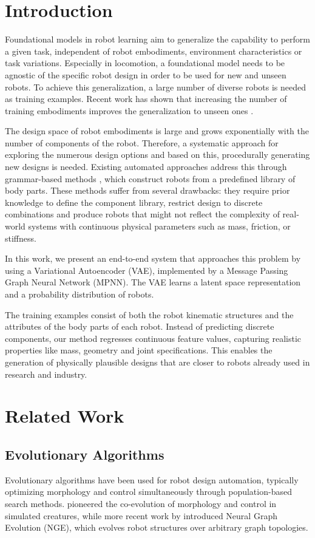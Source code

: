 \documentclass{article}
\theoremstyle{plain}
\theoremstyle{definition}
\theoremstyle{remark}
\begin{document}
\section{Introduction}
Foundational models in robot learning aim to generalize the capability to perform a given task, independent of robot embodiments, environment characteristics or task variations. Especially in locomotion, a foundational model needs to be agnostic of the specific robot design in order to be used for new and unseen robots. To achieve this generalization, a large number of diverse robots is needed as training examples. Recent work has shown that increasing the number of training embodiments improves the generalization to unseen ones \cite{ai2025towards}.

The design space of robot embodiments is large and grows exponentially with the number of components of the robot. Therefore, a systematic approach for exploring the numerous design options and based on this, procedurally generating new designs is needed. Existing automated approaches address this through grammar-based methods \cite{zhao2020robogrammar, hu2023glso}, which construct robots from a predefined library of body parts. These methods suffer from several drawbacks: they require prior knowledge to define the component library, restrict design to discrete combinations and produce robots that might not reflect the complexity of real-world systems with continuous physical parameters such as mass, friction, or stiffness.

In this work, we present an end-to-end system that approaches this problem by using a Variational Autoencoder (VAE), implemented by a Message Passing Graph Neural Network (MPNN). The VAE learns a latent space representation and a probability distribution of robots. 

The training examples consist of both the robot kinematic structures and the attributes of the body parts of each robot. Instead of predicting discrete components, our method regresses continuous feature values, capturing realistic properties like mass, geometry and joint specifications. This enables the generation of physically plausible designs that are closer to robots already used in research and industry.

\section{Related Work}
\subsection{Evolutionary Algorithms}
Evolutionary algorithms have been used for robot design automation, typically optimizing morphology and control simultaneously through population-based search methods. \citet{sims1994evolving} pioneered the co-evolution of morphology and control in simulated creatures, while more recent work by \citet{wangneural} introduced Neural Graph Evolution (NGE), which evolves robot structures over arbitrary graph topologies. 
\end{document}
